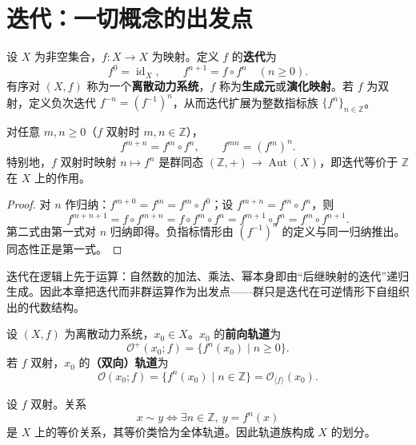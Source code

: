 \section{迭代：一切概念的出发点}

\begin{definition}[迭代与离散动力系统]\label{def:iteration}
设 $X$ 为非空集合，$f:X\to X$ 为映射。定义 $f$ 的\textbf{迭代}为
\[
f^0=\operatorname{id}_X,\qquad f^{n+1}=f\circ f^n\quad(n\ge 0).
\]
有序对 $(X,f)$ 称为一个\textbf{离散动力系统}，$f$ 称为\textbf{生成元}或\textbf{演化映射}。若 $f$ 为双射，定义负次迭代 $f^{-n}=(f^{-1})^n$，从而迭代扩展为整数指标族 $\{f^n\}_{n\in\mathbb{Z}}$。
\end{definition}

\begin{property}[迭代的指数律]\label{prop:iteration_law}
对任意 $m,n\ge 0$（$f$ 双射时 $m,n\in\mathbb{Z}$），
\[
f^{m+n}=f^m\circ f^n,\qquad f^{mn}=(f^m)^n.
\]
特别地，$f$ 双射时映射 $n\mapsto f^n$ 是群同态 $(\mathbb{Z},+)\to\operatorname{Aut}(X)$，即迭代等价于 $\mathbb{Z}$ 在 $X$ 上的作用。
\end{property}

\begin{proof}
对 $n$ 作归纳：$f^{m+0}=f^m=f^m\circ f^0$；设 $f^{m+n}=f^m\circ f^n$，则
\[
f^{m+n+1}=f\circ f^{m+n}=f\circ f^m\circ f^n=f^{m+1}\circ f^n=f^m\circ f^{n+1}.
\]
第二式由第一式对 $n$ 归纳即得。负指标情形由 $(f^{-1})^n$ 的定义与同一归纳推出。同态性正是第一式。
\end{proof}

\begin{remark}[迭代的先在性]\label{rem:iteration_primordial}
迭代在逻辑上先于运算：自然数的加法、乘法、幂本身即由“后继映射的迭代”递归生成。因此本章把迭代而非群运算作为出发点——群只是迭代在可逆情形下自组织出的代数结构。
\end{remark}

\begin{definition}[轨道]\label{def:orbit}
设 $(X,f)$ 为离散动力系统，$x_0\in X$。$x_0$ 的\textbf{前向轨道}为
\[
\mathcal{O}^+(x_0;f)=\{f^n(x_0)\mid n\ge 0\}.
\]
若 $f$ 双射，$x_0$ 的\textbf{（双向）轨道}为
\[
\mathcal{O}(x_0;f)=\{f^n(x_0)\mid n\in\mathbb{Z}\}=\mathcal{O}_{\langle f\rangle}(x_0).
\]
\end{definition}

\begin{proposition}[轨道划分]\label{prop:orbit_partition}
设 $f$ 双射。关系
\[
x\sim y \iff \exists n\in\mathbb{Z},\ y=f^n(x)
\]
是 $X$ 上的等价关系，其等价类恰为全体轨道。因此轨道族构成 $X$ 的划分。
\end{proposition}

